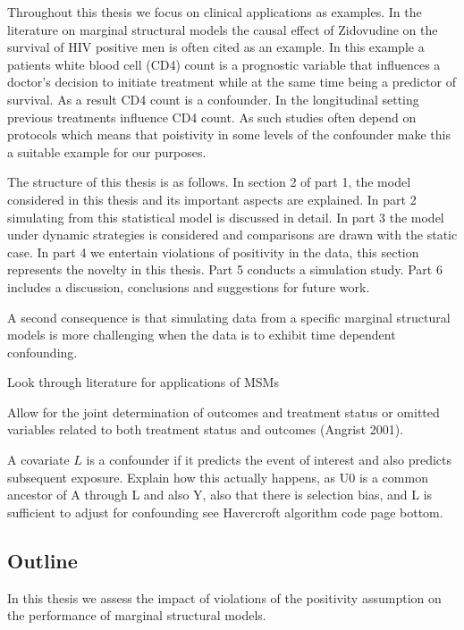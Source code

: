 \documentclass[11pt]{article}
\begin{document}
Throughout this thesis we focus on clinical applications as examples. In
the literature on marginal structural models the causal effect of
Zidovudine on the survival of HIV positive men is often cited as an
example. In this example a patients white blood cell (CD4) count is a
prognostic variable that influences a doctor's decision to initiate
treatment while at the same time being a predictor of survival. As a
result CD4 count is a confounder. In the longitudinal setting previous
treatments influence CD4 count. As such studies often depend on
protocols which means that poistivity in some levels of the confounder
make this a suitable example for our purposes. \linebreak 

The structure of this thesis is as follows. In section 2 of part 1, the
model considered in this thesis and its important aspects are explained.
In part 2 simulating from this statistical model is discussed in detail.
In part 3 the model under dynamic strategies is considered and
comparisons are drawn with the static case. In part 4 we entertain
violations of positivity in the data, this section represents the
novelty in this thesis. Part 5 conducts a simulation study. Part 6
includes a discussion, conclusions and suggestions for future work.
\linebreak

A second consequence is that simulating data from a specific marginal
structural models is more challenging when the data is to exhibit time
dependent confounding.

Look through literature for applications of MSMs

    Allow for the joint determination of outcomes and treatment status or
omitted variables related to both treatment status and outcomes (Angrist
2001).

A covariate \(L\) is a confounder if it predicts the event of interest
and also predicts subsequent exposure. Explain how this actually
happens, as U0 is a common ancestor of A through L and also Y, also that
there is selection bias, and L is sufficient to adjust for confounding
see Havercroft algorithm code page bottom.

    \subsection{Outline}\label{outline}

In this thesis we assess the impact of violations of the positivity
assumption on the performance of marginal structural models. \linebreak
\end{document}
